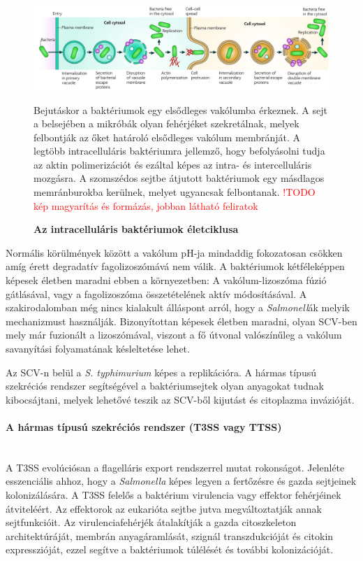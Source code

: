 \documentclass[a4paper,12pt]{article}
\begin{document}
		 \begin{figure}[H]
			 \centering
			 \includegraphics[scale=0.42]{img/salmonella_life_cycle.png}
			 \caption{\textbf{Az intracelluláris baktériumok életciklusa}}
			 Bejutáskor a baktériumok egy elsődleges vakólumba érkeznek. A sejt a belsejében a mikróbák olyan fehérjéket szekretálnak, melyek felbontják az őket határoló elsődleges vakólum membránját. A legtöbb intracelluláris baktériumra jellemző, hogy befolyásolni tudja az aktin polimerizációt és ezáltal képes az intra- és intercelluláris mozgásra. A szomszédos sejtbe átjutott baktériumok egy másdlagos memránburokba kerülnek, melyet ugyancsak felbontanak.
			\textcolor{red}{!TODO kép magyarítás és formázás, jobban látható feliratok}
			 \label{fig:salmo_cycle}
		 \end{figure}
		
		 Normális körülmények között a vakólum pH-ja mindaddig fokozatosan csökken amíg érett degradatív fagolizoszómává nem válik. A baktériumok kétféleképpen képesek életben maradni ebben a környezetben: A vakólum-lizoszóma fúzió gátlásával, vagy a fagolizoszóma összetételének aktív módosításával. \cite{salmonella_autophagy_nature_old} A szakirodalomban még nincs kialakult álláspont arról, hogy a \textit{Salmonell}ák melyik mechanizmust használják. Bizonyítottan képesek életben maradni, olyan SCV-ben mely már fuzionált a lizoszómával, viszont a fő útvonal valószínűleg a vakólum savanyítási folyamatának késleltetése lehet. \cite{salmonella_and_host_cell_nature} 
		 
		 Az SCV-n belül a \textit{S. typhimurium} képes a replikációra. A hármas típusú szekréciós rendszer segítségével a baktériumsejtek olyan anyagokat tudnak kibocsájtani, melyek lehetővé teszik az SCV-ből kijutást és citoplazma invázióját. \cite{salmonella_authopagy_intro}
		 
		 \paragraph{A hármas típusú szekréciós rendszer (T3SS vagy TTSS)} \mbox{}\\
		 A T3SS evolúciósan a flagelláris export rendszerrel mutat rokonságot. Jelenléte esszenciális ahhoz, hogy a \textit{Salmonella} képes legyen a fertőzésre és gazda sejtjeinek kolonizálására. A T3SS felelős a baktérium virulencia vagy effektor fehérjéinek átviteléért. Az effektorok az eukarióta sejtbe jutva megváltoztatják annak sejtfunkcióit. Az virulenciafehérjék átalakítják a gazda citoszkeleton architektúráját, membrán anyagáramlását, szignál transzdukcióját és citokin expresszióját, ezzel segítve a baktériumok túlélését és további kolonizációját. \cite{salmonella_and_host_cell_nature}
		 
\end{document}
